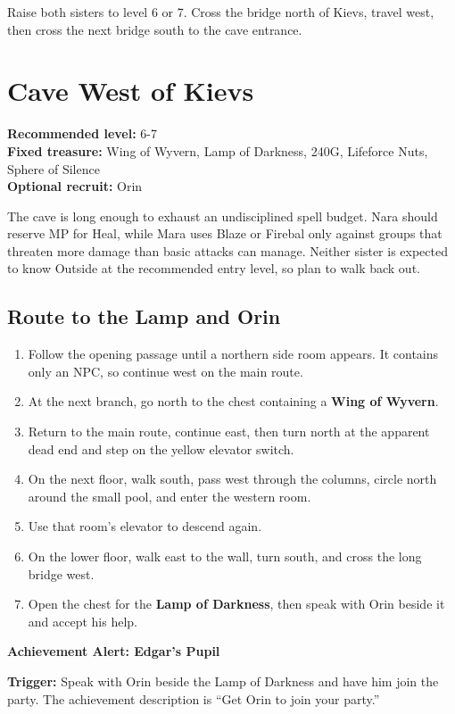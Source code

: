 \documentclass[
  american,
  10pt,
  letterpaper,
  oneside,
  open=any]{scrreprt}
\providecommand{\tightlist}{%
  \setlength{\itemsep}{0pt}\setlength{\parskip}{0pt}}
\begin{document}
Raise both sisters to level 6 or 7. Cross the bridge north of Kievs,
travel west, then cross the next bridge south to the cave entrance.

\section{Cave West of Kievs}\label{cave-west-of-kievs}

\textbf{Recommended level:} 6-7\\
\textbf{Fixed treasure:} Wing of Wyvern, Lamp of Darkness, 240G,
Lifeforce Nuts, Sphere of Silence\\
\textbf{Optional recruit:} Orin

The cave is long enough to exhaust an undisciplined spell budget. Nara
should reserve MP for Heal, while Mara uses Blaze or Firebal only
against groups that threaten more damage than basic attacks can manage.
Neither sister is expected to know Outside at the recommended entry
level, so plan to walk back out.

\subsection{Route to the Lamp and
Orin}\label{route-to-the-lamp-and-orin}

\begin{enumerate}
\def\labelenumi{\arabic{enumi}.}
\tightlist
\item
  Follow the opening passage until a northern side room appears. It
  contains only an NPC, so continue west on the main route.
\item
  At the next branch, go north to the chest containing a \textbf{Wing of
  Wyvern}.
\item
  Return to the main route, continue east, then turn north at the
  apparent dead end and step on the yellow elevator switch.
\item
  On the next floor, walk south, pass west through the columns, circle
  north around the small pool, and enter the western room.
\item
  Use that room's elevator to descend again.
\item
  On the lower floor, walk east to the wall, turn south, and cross the
  long bridge west.
\item
  Open the chest for the \textbf{Lamp of Darkness}, then speak with Orin
  beside it and accept his help.
\end{enumerate}

\begin{achievementalert}

\textbf{Achievement Alert: Edgar's Pupil}

\textbf{Trigger:} Speak with Orin beside the Lamp of Darkness and have
him join the party. The achievement description is ``Get Orin to join
your party.''

\end{achievementalert}
\end{document}
